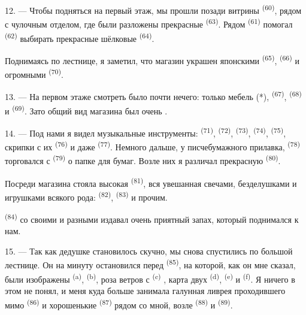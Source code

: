 12. --- Чтобы подняться на первый этаж, мы прошли позади витрины
 \textsuperscript{(60)}, рядом с чулочным отделом, где были
разложены прекрасные  \textsuperscript{(63)}. Рядом
 \textsuperscript{(61)} помогал 
\textsuperscript{(62)} выбирать прекрасные шёлковые  \textsuperscript{(64)}.

Поднимаясь по лестнице, я заметил, что магазин украшен японскими
 \textsuperscript{(65)},  \textsuperscript{(66)} и
огромными  \textsuperscript{(70)}.

13. --- На первом этаже смотреть было почти нечего: только мебель (*),
 \textsuperscript{(67)},  \textsuperscript{(68)}
и  \textsuperscript{(69)}. Зато общий вид магазина был
очень .

14. --- Под нами я видел музыкальные инструменты: 
\textsuperscript{(71)},  \textsuperscript{(72)}, 
\textsuperscript{(73)},  \textsuperscript{(74)}, 
\textsuperscript{(75)}, скрипки с их  \textsuperscript{(76)} и даже
 \textsuperscript{(77)}. Немного дальше, у писчебумажного
прилавка,  \textsuperscript{(78)} торговался с
 \textsuperscript{(79)} о папке для бумаг. Возле них я
различал прекрасную  \textsuperscript{(80)}.

Посреди магазина стояла высокая  \textsuperscript{(81)},
вся увешанная свечами, безделушками и игрушками всякого рода:
 \textsuperscript{(82)}, 
\textsuperscript{(83)} и прочим.

 \textsuperscript{(84)} со своими  и разными  издавал очень приятный запах, который
поднимался к нам.

\VUsaut{3.4mm}
\VUsaut{2.8mm}

15. --- Так как дедушке становилось скучно, мы снова спустились по большой
лестнице. Он на минуту остановился перед 
\textsuperscript{(85)}, на которой, как он мне сказал, были изображены
 \textsuperscript{(a)}, 
\textsuperscript{(b)}, роза ветров с 
\textsuperscript{(c)} , карта двух
 \textsuperscript{(d)},  \textsuperscript{(e)} и
 \textsuperscript{(f)}. Я ничего в этом не понял, и
меня куда больше занимала галунная ливрея проходившего мимо
 \textsuperscript{(86)} и хорошенькие 
\textsuperscript{(87)} рядом со мной, возле  \textsuperscript{(88)} и
 \textsuperscript{(89)}.

